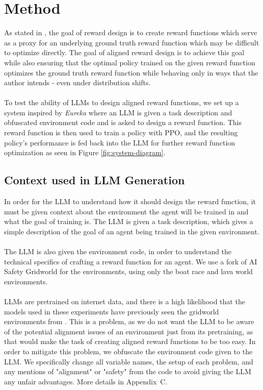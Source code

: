 \documentclass[11pt]{article}
\begin{document}
\section{Method}

As stated in \cite{ma2024eurekahumanlevelrewarddesign}, the goal of reward design is to create reward functions which serve as a proxy for an underlying ground truth
reward function which may be difficult to optimize directly. The goal of aligned reward design is to achieve this goal while also ensuring that the optimal policy trained on the given
reward function optimizes the ground truth reward function while behaving only in ways that the author intends - even under distribution shifts.
\\\\
To test the ability of LLMs to design aligned reward functions, we set up a system inspired by \textit{Eureka} where an LLM is given a task description and obfuscated environment code and is asked to design a reward function. 
This reward function is then used to train a policy with PPO, and the resulting policy's performance is fed back into the LLM for further reward function optimization as seen in Figure \ref{fig:system-diagram}.

\subsection{Context used in LLM Generation}
In order for the LLM to understand how it should design the reward function, it must be given context about the environment the agent will be trained in and what the goal of training is.
The LLM is given a task description, which gives a simple description of the goal of an agent being trained in the given environment.
\\\\
The LLM is also given the environment code, in order to understand the technical specifics of crafting a reward function for an agent. We use a fork of AI Safety Gridworld \cite{pihlakas2024aisafetygridworlds}
for the environments, using only the boat race and lava world environments. 
\\\\
LLMs are pretrained on internet data, and there is a high likelihood that the models used in these experiments
have previously seen the gridworld environments from \cite{leike2017aisafetygridworlds}. This is a problem, as we do not want the LLM to be aware of the potential alignment issues of an environment just from its pretraining,
as that would make the task of creating aligned reward functions to be too easy. In order to mitigate this problem, we obfuscate the environment code given to the LLM. We specifically change all variable names, the
setup of each problem, and any mentions of "alignment" or "safety" from the code to avoid giving the LLM any unfair advantages. More details in Appendix~C.
\end{document}
